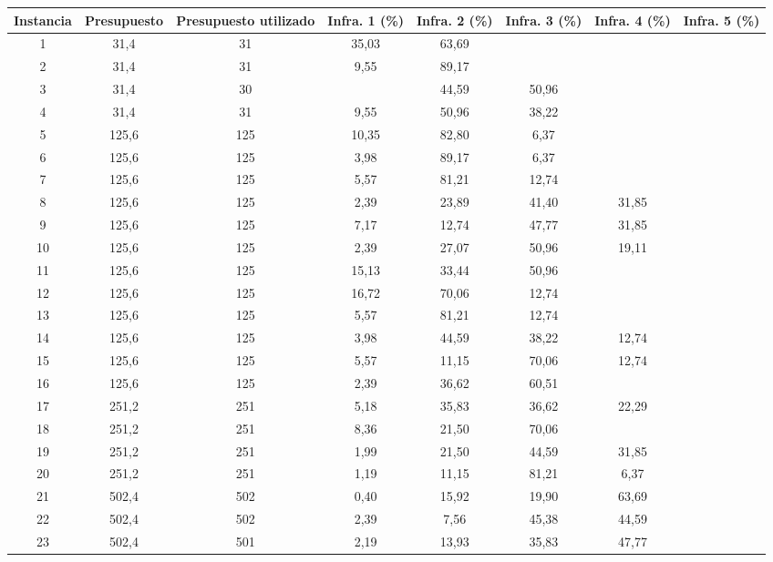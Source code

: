 \documentclass{article}
\begin{document}
  \begin{table}
    \centering
    \begin{tabular}{cccccccc}
        \toprule
        Instancia & Presupuesto & Presupuesto utilizado & Infra. 1 (\%) & Infra. 2 (\%) & Infra. 3 (\%) & Infra. 4 (\%) & Infra. 5 (\%) \\
        \midrule
        1 & 31,4 & 31 & 35,03 & 63,69 &  &  &  \\
        2 & 31,4 & 31 & 9,55 & 89,17 &  &  &  \\
        3 & 31,4 & 30 &  & 44,59 & 50,96 &  &  \\
        4 & 31,4 & 31 & 9,55 & 50,96 & 38,22 &  &  \\
        5 & 125,6 & 125 & 10,35 & 82,80 & 6,37 &  &  \\
        6 & 125,6 & 125 & 3,98 & 89,17 & 6,37 &  &  \\
        7 & 125,6 & 125 & 5,57 & 81,21 & 12,74 &  &  \\
        8 & 125,6 & 125 & 2,39 & 23,89 & 41,40 & 31,85 &  \\
        9 & 125,6 & 125 & 7,17 & 12,74 & 47,77 & 31,85 &  \\
        10 & 125,6 & 125 & 2,39 & 27,07 & 50,96 & 19,11 &  \\
        11 & 125,6 & 125 & 15,13 & 33,44 & 50,96 &  &  \\
        12 & 125,6 & 125 & 16,72 & 70,06 & 12,74 &  &  \\
        13 & 125,6 & 125 & 5,57 & 81,21 & 12,74 &  &  \\
        14 & 125,6 & 125 & 3,98 & 44,59 & 38,22 & 12,74 &  \\
        15 & 125,6 & 125 & 5,57 & 11,15 & 70,06 & 12,74 &  \\
        16 & 125,6 & 125 & 2,39 & 36,62 & 60,51 &  &  \\
        17 & 251,2 & 251 & 5,18 & 35,83 & 36,62 & 22,29 &  \\
        18 & 251,2 & 251 & 8,36 & 21,50 & 70,06 &  &  \\
        19 & 251,2 & 251 & 1,99 & 21,50 & 44,59 & 31,85 &  \\
        20 & 251,2 & 251 & 1,19 & 11,15 & 81,21 & 6,37 &  \\
        21 & 502,4 & 502 & 0,40 & 15,92 & 19,90 & 63,69 &  \\
        22 & 502,4 & 502 & 2,39 & 7,56 & 45,38 & 44,59 &  \\
        23 & 502,4 & 501 & 2,19 & 13,93 & 35,83 & 47,77 &  \\

\end{tabular}
\end{table}
\end{document}
